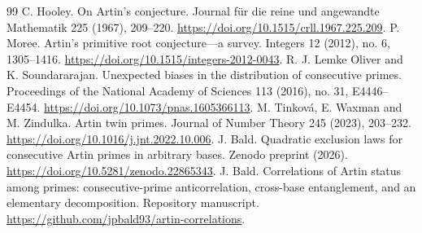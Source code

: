 \begin{thebibliography}{99}
 C. Hooley. On Artin's conjecture. Journal f\"ur die reine und angewandte Mathematik 225 (1967), 209--220. \url{https://doi.org/10.1515/crll.1967.225.209}.
 P. Moree. Artin's primitive root conjecture---a survey. Integers 12 (2012), no. 6, 1305--1416. \url{https://doi.org/10.1515/integers-2012-0043}.
 R. J. Lemke Oliver and K. Soundararajan. Unexpected biases in the distribution of consecutive primes. Proceedings of the National Academy of Sciences 113 (2016), no. 31, E4446--E4454. \url{https://doi.org/10.1073/pnas.1605366113}.
 M. Tinkov\'{a}, E. Waxman and M. Zindulka. Artin twin primes. Journal of Number Theory 245 (2023), 203--232. \url{https://doi.org/10.1016/j.jnt.2022.10.006}.
 J. Bald. Quadratic exclusion laws for consecutive Artin primes in arbitrary bases. Zenodo preprint (2026). \url{https://doi.org/10.5281/zenodo.22865343}.
 J. Bald. Correlations of Artin status among primes: consecutive-prime anticorrelation, cross-base entanglement, and an elementary decomposition. Repository manuscript. \url{https://github.com/jpbald93/artin-correlations}.
\end{thebibliography}
